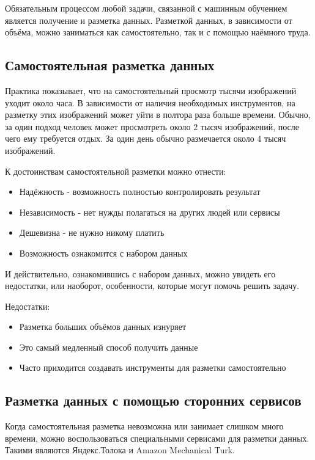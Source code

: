 Обязательным процессом любой задачи, связанной с машинным обучением является получение и разметка данных. Разметкой данных, в зависимости от объёма, можно заниматься как самостоятельно, так и с помощью наёмного труда. 

\subsection{Самостоятельная разметка данных} \label{subsect1_3_1}
Практика показывает, что на самостоятельный просмотр тысячи изображений уходит около часа. В зависимости от наличия необходимых инструментов, на разметку этих изображений может уйти в полтора раза больше времени. Обычно, за один подход человек может просмотреть около 2 тысяч изображений, после чего ему требуется отдых. За один день обычно размечается около 4 тысяч изображений.

К достоинствам самостоятельной разметки можно отнести:
\begin{itemize}
    \item Надёжность - возможность полностью контролировать результат
    \item Независимость - нет нужды полагаться на других людей или сервисы
    \item Дешевизна - не нужно никому платить
    \item Возможность ознакомится с набором данных
\end{itemize}
И действительно, ознакомившись с набором данных, можно увидеть его недостатки, или наоборот, особенности, которые могут помочь решить задачу.

Недостатки:
\begin{itemize}
    \item Разметка больших объёмов данных изнуряет
    \item Это самый медленный способ получить данные
    \item Часто приходится создавать инструменты для разметки самостоятельно
\end{itemize}


\subsection{Разметка данных с помощью сторонних сервисов} \label{subsect1_4_2}
Когда самостоятельная разметка невозможна или занимает слишком много времени, можно воспользоваться специальными сервисами для разметки данных. Такими являются Яндекс.Толока и Amazon Mechanical Turk.

